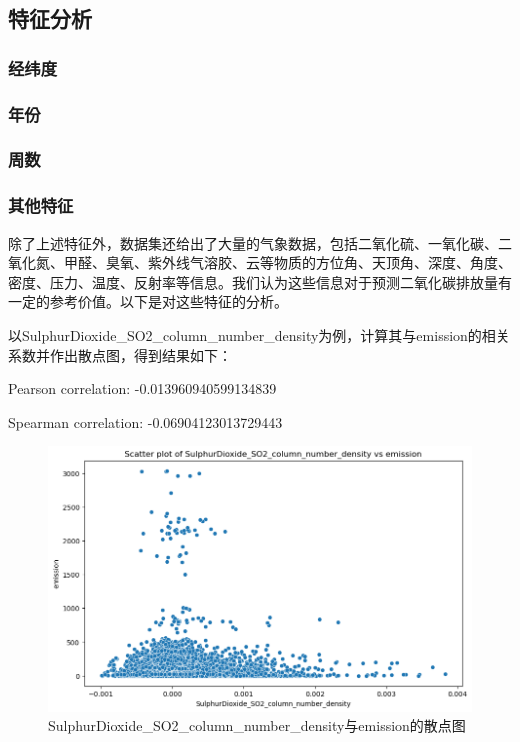 \documentclass[fontset=windows]{article}
\begin{document}
\subsection{特征分析}

\subsubsection{经纬度}

\subsubsection{年份}

\subsubsection{周数}

\subsubsection{其他特征}

除了上述特征外，数据集还给出了大量的气象数据，包括二氧化硫、一氧化碳、二氧化氮、甲醛、臭氧、紫外线气溶胶、云等物质的方位角、天顶角、深度、角度、密度、压力、温度、反射率等信息。我们认为这些信息对于预测二氧化碳排放量有一定的参考价值。以下是对这些特征的分析。

以SulphurDioxide\_SO2\_column\_number\_density为例，计算其与emission的相关系数并作出散点图，得到结果如下：

\begin{center}
Pearson correlation: -0.013960940599134839

Spearman correlation: -0.06904123013729443
\end{center}


\begin{figure}[H]
      \centering
      \includegraphics[width=1\textwidth]{output1.png}
      \caption{SulphurDioxide\_SO2\_column\_number\_density与emission的散点图}
\end{figure}
\end{document}
